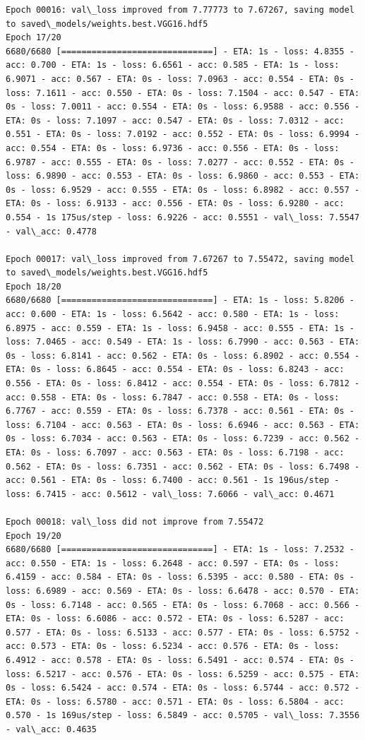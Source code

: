 \documentclass[11pt]{article}
\begin{document}
\begin{Verbatim}[commandchars=\\\{\}]
Epoch 00016: val\_loss improved from 7.77773 to 7.67267, saving model to saved\_models/weights.best.VGG16.hdf5
Epoch 17/20
6680/6680 [==============================] - ETA: 1s - loss: 4.8355 - acc: 0.700 - ETA: 1s - loss: 6.6561 - acc: 0.585 - ETA: 1s - loss: 6.9071 - acc: 0.567 - ETA: 0s - loss: 7.0963 - acc: 0.554 - ETA: 0s - loss: 7.1611 - acc: 0.550 - ETA: 0s - loss: 7.1504 - acc: 0.547 - ETA: 0s - loss: 7.0011 - acc: 0.554 - ETA: 0s - loss: 6.9588 - acc: 0.556 - ETA: 0s - loss: 7.1097 - acc: 0.547 - ETA: 0s - loss: 7.0312 - acc: 0.551 - ETA: 0s - loss: 7.0192 - acc: 0.552 - ETA: 0s - loss: 6.9994 - acc: 0.554 - ETA: 0s - loss: 6.9736 - acc: 0.556 - ETA: 0s - loss: 6.9787 - acc: 0.555 - ETA: 0s - loss: 7.0277 - acc: 0.552 - ETA: 0s - loss: 6.9890 - acc: 0.553 - ETA: 0s - loss: 6.9860 - acc: 0.553 - ETA: 0s - loss: 6.9529 - acc: 0.555 - ETA: 0s - loss: 6.8982 - acc: 0.557 - ETA: 0s - loss: 6.9133 - acc: 0.556 - ETA: 0s - loss: 6.9280 - acc: 0.554 - 1s 175us/step - loss: 6.9226 - acc: 0.5551 - val\_loss: 7.5547 - val\_acc: 0.4778

Epoch 00017: val\_loss improved from 7.67267 to 7.55472, saving model to saved\_models/weights.best.VGG16.hdf5
Epoch 18/20
6680/6680 [==============================] - ETA: 1s - loss: 5.8206 - acc: 0.600 - ETA: 1s - loss: 6.5642 - acc: 0.580 - ETA: 1s - loss: 6.8975 - acc: 0.559 - ETA: 1s - loss: 6.9458 - acc: 0.555 - ETA: 1s - loss: 7.0465 - acc: 0.549 - ETA: 1s - loss: 6.7990 - acc: 0.563 - ETA: 0s - loss: 6.8141 - acc: 0.562 - ETA: 0s - loss: 6.8902 - acc: 0.554 - ETA: 0s - loss: 6.8645 - acc: 0.554 - ETA: 0s - loss: 6.8243 - acc: 0.556 - ETA: 0s - loss: 6.8412 - acc: 0.554 - ETA: 0s - loss: 6.7812 - acc: 0.558 - ETA: 0s - loss: 6.7847 - acc: 0.558 - ETA: 0s - loss: 6.7767 - acc: 0.559 - ETA: 0s - loss: 6.7378 - acc: 0.561 - ETA: 0s - loss: 6.7104 - acc: 0.563 - ETA: 0s - loss: 6.6946 - acc: 0.563 - ETA: 0s - loss: 6.7034 - acc: 0.563 - ETA: 0s - loss: 6.7239 - acc: 0.562 - ETA: 0s - loss: 6.7097 - acc: 0.563 - ETA: 0s - loss: 6.7198 - acc: 0.562 - ETA: 0s - loss: 6.7351 - acc: 0.562 - ETA: 0s - loss: 6.7498 - acc: 0.561 - ETA: 0s - loss: 6.7400 - acc: 0.561 - 1s 196us/step - loss: 6.7415 - acc: 0.5612 - val\_loss: 7.6066 - val\_acc: 0.4671

Epoch 00018: val\_loss did not improve from 7.55472
Epoch 19/20
6680/6680 [==============================] - ETA: 1s - loss: 7.2532 - acc: 0.550 - ETA: 1s - loss: 6.2648 - acc: 0.597 - ETA: 0s - loss: 6.4159 - acc: 0.584 - ETA: 0s - loss: 6.5395 - acc: 0.580 - ETA: 0s - loss: 6.6989 - acc: 0.569 - ETA: 0s - loss: 6.6478 - acc: 0.570 - ETA: 0s - loss: 6.7148 - acc: 0.565 - ETA: 0s - loss: 6.7068 - acc: 0.566 - ETA: 0s - loss: 6.6086 - acc: 0.572 - ETA: 0s - loss: 6.5287 - acc: 0.577 - ETA: 0s - loss: 6.5133 - acc: 0.577 - ETA: 0s - loss: 6.5752 - acc: 0.573 - ETA: 0s - loss: 6.5234 - acc: 0.576 - ETA: 0s - loss: 6.4912 - acc: 0.578 - ETA: 0s - loss: 6.5491 - acc: 0.574 - ETA: 0s - loss: 6.5217 - acc: 0.576 - ETA: 0s - loss: 6.5259 - acc: 0.575 - ETA: 0s - loss: 6.5424 - acc: 0.574 - ETA: 0s - loss: 6.5744 - acc: 0.572 - ETA: 0s - loss: 6.5780 - acc: 0.571 - ETA: 0s - loss: 6.5804 - acc: 0.570 - 1s 169us/step - loss: 6.5849 - acc: 0.5705 - val\_loss: 7.3556 - val\_acc: 0.4635


\end{Verbatim}
\end{document}
